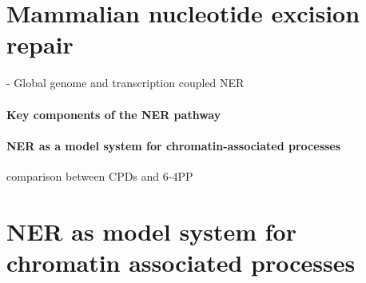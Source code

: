 \section{Mammalian nucleotide excision repair}
\label{sec:NERexperiments}
- Global genome and transcription coupled NER

\paragraph{Key components of the NER pathway}
\paragraph{NER as a model system for chromatin-associated processes}
comparison between CPDs and 6-4PP

\section{NER as model system for chromatin associated processes}

